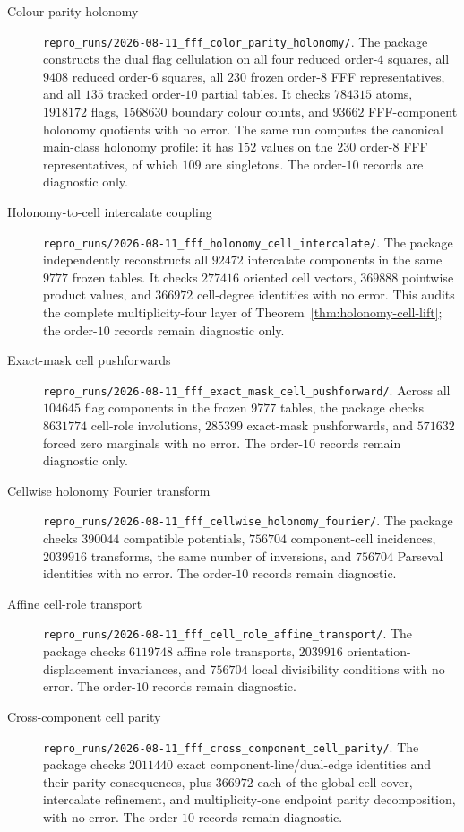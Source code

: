 \begin{description}
\item[Colour-parity holonomy]
\nolinkurl{repro_runs/2026-08-11_fff_color_parity_holonomy/}.
The package constructs the dual flag cellulation on all four reduced
order-$4$ squares, all $9408$ reduced order-$6$ squares, all $230$ frozen
order-$8$ FFF representatives, and all $135$ tracked order-$10$ partial
tables.  It checks $784315$ atoms, $1918172$ flags, $1568630$ boundary
colour counts, and $93662$ FFF-component holonomy quotients with no error.
The same run computes the canonical main-class holonomy profile: it has
$152$ values on the $230$ order-$8$ FFF representatives, of which $109$ are
singletons.  The order-$10$ records are diagnostic only.

\item[Holonomy-to-cell intercalate coupling]
\nolinkurl{repro_runs/2026-08-11_fff_holonomy_cell_intercalate/}.
The package independently reconstructs all $92472$ intercalate components
in the same $9777$ frozen tables.  It checks $277416$ oriented cell vectors,
$369888$ pointwise product values, and $366972$ cell-degree identities with
no error.  This audits the complete multiplicity-four layer of
Theorem~\ref{thm:holonomy-cell-lift}; the order-$10$ records remain
diagnostic only.

\item[Exact-mask cell pushforwards]
\nolinkurl{repro_runs/2026-08-11_fff_exact_mask_cell_pushforward/}.
Across all $104645$ flag components in the frozen $9777$ tables, the package
checks $8631774$ cell-role involutions, $285399$ exact-mask pushforwards, and
$571632$ forced zero marginals with no error.  The order-$10$ records remain
diagnostic only.

\item[Cellwise holonomy Fourier transform]
\nolinkurl{repro_runs/2026-08-11_fff_cellwise_holonomy_fourier/}.
The package checks $390044$ compatible potentials, $756704$ component-cell
incidences, $2039916$ transforms, the same number of inversions, and $756704$
Parseval identities with no error.  The order-$10$ records remain diagnostic.

\item[Affine cell-role transport]
\nolinkurl{repro_runs/2026-08-11_fff_cell_role_affine_transport/}.
The package checks $6119748$ affine role transports, $2039916$ orientation-
displacement invariances, and $756704$ local divisibility conditions with no
error.  The order-$10$ records remain diagnostic.

\item[Cross-component cell parity]
\nolinkurl{repro_runs/2026-08-11_fff_cross_component_cell_parity/}.
The package checks $2011440$ exact component-line/dual-edge identities and
their parity consequences, plus $366972$ each of the global cell cover,
intercalate refinement, and multiplicity-one endpoint parity decomposition,
with no error.  The order-$10$ records remain diagnostic.


\end{description}

